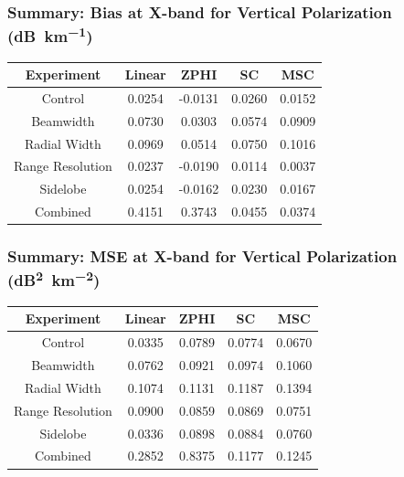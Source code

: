 \documentclass[red]{beamer}
\begin{document}
\begin{frame}
    \frametitle{Summary: Bias at X-band for Vertical Polarization (\si{dB\per \kilo\meter})}
    \begin{center}
        \begin{tabular}{| c | c | c | c | c |}
            \hline
            Experiment & Linear & ZPHI & SC & MSC \\
            \hline
            \hline
            Control & 0.0254 & -0.0131 & 0.0260 & 0.0152 \\
            Beamwidth & 0.0730 & 0.0303 & 0.0574 & 0.0909 \\
            Radial Width & 0.0969 & 0.0514 & 0.0750 & 0.1016 \\
            Range Resolution & 0.0237 & -0.0190 & 0.0114 & 0.0037 \\
            Sidelobe & 0.0254 & -0.0162 & 0.0230 & 0.0167 \\
            Combined & 0.4151 & 0.3743 & 0.0455 & 0.0374 \\
            \hline
        \end{tabular}
    \end{center}
\end{frame}

\begin{frame}
    \frametitle{Summary: MSE at X-band for Vertical Polarization (\si{dB\squared\per \kilo\meter\squared})}
    \begin{center}
        \begin{tabular}{| c | c | c | c | c |}
            \hline
            Experiment & Linear & ZPHI & SC & MSC \\
            \hline
            \hline
            Control & 0.0335 & 0.0789 & 0.0774 & 0.0670 \\
            Beamwidth & 0.0762 & 0.0921 & 0.0974 & 0.1060 \\
            Radial Width & 0.1074 & 0.1131 & 0.1187 & 0.1394 \\
            Range Resolution & 0.0900 & 0.0859 & 0.0869 & 0.0751 \\
            Sidelobe & 0.0336 & 0.0898 & 0.0884 & 0.0760 \\
            Combined & 0.2852 & 0.8375 & 0.1177 & 0.1245 \\
            \hline
        \end{tabular}
    \end{center}
\end{frame}
\end{document}
